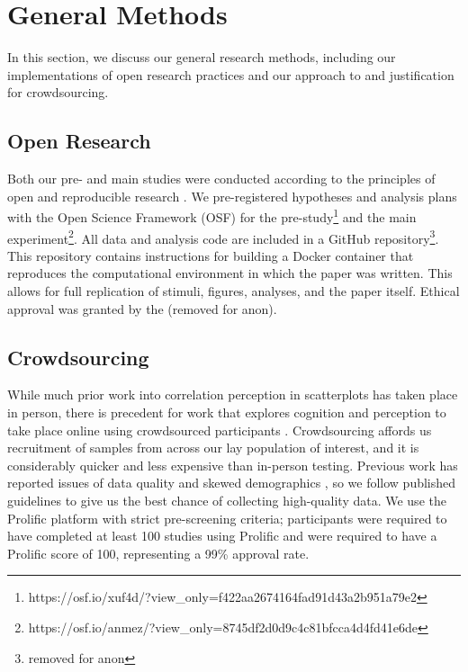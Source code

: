\documentclass[manuscript,screen,review,anonymous]{acmart}
\begin{document}
\section{General Methods}\label{sec-general-methods}

In this section, we discuss our general research methods, including our
implementations of open research practices and our approach to and
justification for crowdsourcing.

\subsection{Open Research}\label{sec-open-research}

Both our pre- and main studies were conducted according to the
principles of open and reproducible research \citep{ayris_2018}. We
pre-registered hypotheses and analysis plans with the Open Science
Framework (OSF) for the pre-study\footnote{https://osf.io/xuf4d/?view\_only=f422aa2674164fad91d43a2b951a79e2}
and the main experiment\footnote{https://osf.io/anmez/?view\_only=8745df2d0d9c4c81bfcca4d4fd41e6de}.
All data and analysis code are included in a GitHub
repository\footnote{removed for anon}. This repository contains
instructions for building a Docker container \citep{merkel_2014} that
reproduces the computational environment in which the paper was written.
This allows for full replication of stimuli, figures, analyses, and the
paper itself. Ethical approval was granted by the (removed for anon).

\subsection{Crowdsourcing}\label{sec-crowdsourcing}

While much prior work into correlation perception in scatterplots has
taken place in person, there is precedent for work that explores
cognition and perception to take place online using crowdsourced
participants \citep{xiong_2022}. Crowdsourcing affords us recruitment of
samples from across our lay population of interest, and it is
considerably quicker and less expensive than in-person testing. Previous
work has reported issues of data quality and skewed demographics
\citep{chmielewski_2020, charalambides_2021, peer_2021}, so we follow
published guidelines \citep{peer_2021} to give us the best chance of
collecting high-quality data. We use the Prolific platform
\citep{prolific} with strict pre-screening criteria; participants were
required to have completed at least 100 studies using Prolific and were
required to have a Prolific score of 100, representing a 99\% approval
rate.
\end{document}

